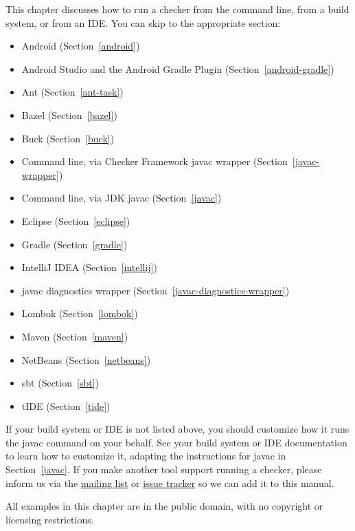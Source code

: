 
This chapter discusses how to run a checker from the command line, from a
build system, or from an IDE\@.  You can skip to the appropriate section:

\begin{itemize}
\item Android (Section~\ref{android})
\item Android Studio and the Android Gradle Plugin (Section~\ref{android-gradle})
\item Ant (Section~\ref{ant-task})
\item Bazel (Section~\ref{bazel})
\item Buck (Section~\ref{buck})
\item Command line, via Checker Framework javac wrapper (Section~\ref{javac-wrapper})
\item Command line, via JDK javac (Section~\ref{javac})
\item Eclipse (Section~\ref{eclipse})
\item Gradle (Section~\ref{gradle})
\item IntelliJ IDEA (Section~\ref{intellij})
\item javac diagnostics wrapper (Section~\ref{javac-diagnostics-wrapper})
\item Lombok (Section~\ref{lombok})
\item Maven (Section~\ref{maven})
\item NetBeans (Section~\ref{netbeans})
\item sbt (Section~\ref{sbt})
\item tIDE (Section~\ref{tide})
\end{itemize}

If your build system or IDE is not listed above, you should customize how
it runs the javac command on your behalf.  See your build system or IDE
documentation to learn how to
customize it, adapting the instructions for javac in Section~\ref{javac}.
If you make another tool support running a checker, please
inform us via the
\href{https://groups.google.com/forum/#!forum/checker-framework-discuss}{mailing
  list} or
\href{https://github.com/typetools/checker-framework/issues}{issue tracker} so
we can add it to this manual.

All examples in this chapter are in the public domain, with no copyright or
licensing restrictions.


